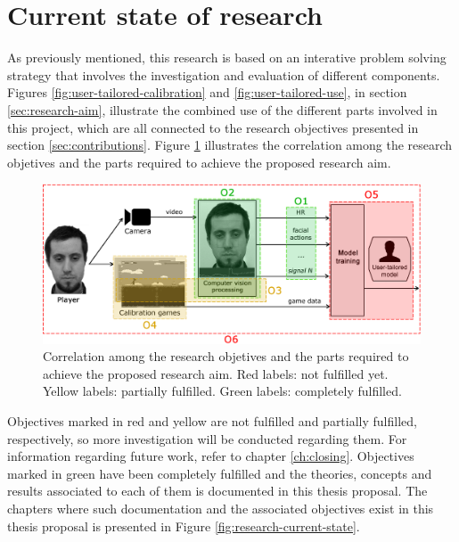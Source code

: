 \section{Current state of research}

As previously mentioned, this research is based on an interative problem solving strategy that involves the investigation and evaluation of different components. Figures \ref{fig:user-tailored-calibration} and \ref{fig:user-tailored-use}, in section \ref{sec:research-aim}, illustrate the combined use of the different parts involved in this project, which are all connected to the research objectives presented in section \ref{sec:contributions}. Figure \ref{fig:components-objectives} illustrates the correlation among the research objetives and the parts required to achieve the proposed research aim.

\begin{figure}[h]
    \centering
    \includegraphics[width=\textwidth]{figures/components-objectives.png}
    \caption{Correlation among the research objetives and the parts required to achieve the proposed research aim. Red labels: not fulfilled yet. Yellow labels: partially fulfilled. Green labels: completely fulfilled.}
    \label{fig:components-objectives}
\end{figure}

Objectives marked in red and yellow are not fulfilled and partially fulfilled, respectively, so more investigation will be conducted regarding them. For information regarding future work, refer to chapter \ref{ch:closing}. Objectives marked in green have been completely fulfilled and the theories, concepts and results associated to each of them is documented in this thesis proposal. The chapters where such documentation and the associated objectives exist in this thesis proposal is presented in Figure \ref{fig:research-current-state}.

